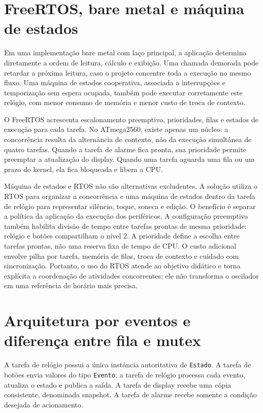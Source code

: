 \section{FreeRTOS, bare metal e máquina de estados}

Em uma implementação bare metal com laço principal, a aplicação determina diretamente a ordem de leitura, cálculo e exibição. Uma chamada demorada pode retardar a próxima leitura, caso o projeto concentre toda a execução no mesmo fluxo. Uma máquina de estados cooperativa, associada a interrupções e temporização sem espera ocupada, também pode executar corretamente este relógio, com menor consumo de memória e menor custo de troca de contexto.

O FreeRTOS acrescenta escalonamento preemptivo, prioridades, filas e estados de execução para cada tarefa. No ATmega2560, existe apenas um núcleo: a concorrência resulta da alternância de contexto, não da execução simultânea de quatro tarefas. Quando a tarefa de alarme fica pronta, sua prioridade permite preemptar a atualização do display. Quando uma tarefa aguarda uma fila ou um prazo do kernel, ela fica bloqueada e libera a CPU.

Máquina de estados e RTOS não são alternativas excludentes. A solução utiliza o RTOS para organizar a concorrência e uma máquina de estados dentro da tarefa de relógio para representar silêncio, toque, soneca e edição. O benefício é separar a política da aplicação da execução dos periféricos. A configuração preemptiva também habilita divisão de tempo entre tarefas prontas de mesma prioridade: relógio e botões compartilham o nível 2. A prioridade define a escolha entre tarefas prontas, não uma reserva fixa de tempo de CPU. O custo adicional envolve pilha por tarefa, memória de filas, troca de contexto e cuidado com sincronização. Portanto, o uso do RTOS atende ao objetivo didático e torna explícita a coordenação de atividades concorrentes; ele não transforma o oscilador em uma referência de horário mais precisa.

\section{Arquitetura por eventos e diferença entre fila e mutex}

A tarefa de relógio possui a única instância autoritativa de \texttt{Estado}. A tarefa de botões envia valores do tipo \texttt{Evento}; a tarefa de relógio processa cada evento, atualiza o estado e publica a saída. A tarefa de display recebe uma cópia consistente, denominada snapshot. A tarefa de alarme recebe somente a condição desejada de acionamento.

